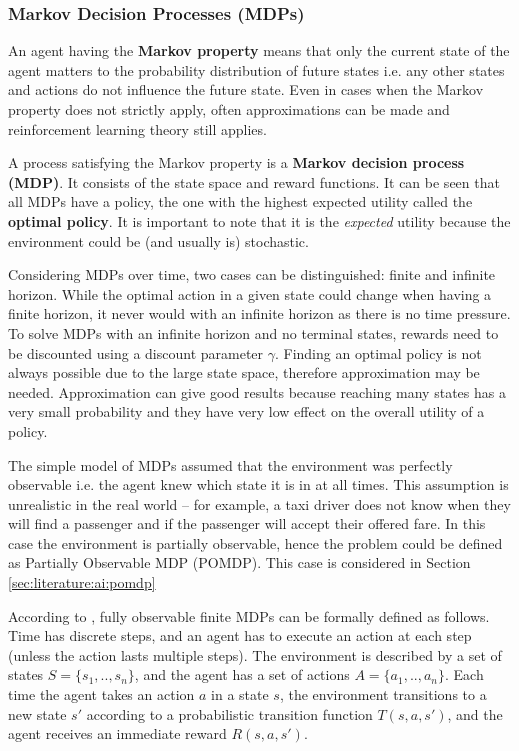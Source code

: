 \subsubsection{Markov Decision Processes (MDPs)}
\label{sec:literature:ai:mdp}

An agent having the \textbf{Markov property} means that only the current state
of the agent matters to the probability distribution of future states i.e. any
other states and actions do not influence the future state. Even in cases when
the Markov property does not strictly apply, often approximations can be made
and reinforcement learning theory still applies.
\parencite{Sutton1998ai+reinforcement}

A process satisfying the Markov property is a \textbf{Markov decision process
(MDP)}. It consists of the state space and reward functions. It can be seen
that all MDPs have a policy, the one with the highest expected utility called
the \textbf{optimal policy}. It is important to note that it is the
\textit{expected} utility because the environment could be (and usually is)
stochastic. \parencite{Russell2010ai+modern}

Considering MDPs over time, two cases can be distinguished: finite and infinite
horizon. While the optimal action in a given state could change when having a
finite horizon, it never would with an infinite horizon as there is no time
pressure. To solve MDPs with an infinite horizon and no terminal states,
rewards need to be discounted using a discount parameter \(\gamma\). Finding an
optimal policy is not always possible due to the large state space, therefore
approximation may be needed. Approximation can give good results because
reaching many states has a very small probability and they have very low effect
on the overall utility of a policy. \parencite{Russell2010ai+modern}

The simple model of MDPs assumed that the environment was perfectly observable
i.e. the agent knew which state it is in at all times. This assumption is
unrealistic in the real world -- for example, a taxi driver does not know when
they will find a passenger and if the passenger will accept their offered fare.
In this case the environment is partially observable, hence the problem could
be defined as Partially Observable MDP (POMDP). This case is considered in
Section \ref{sec:literature:ai:pomdp}

According to \textcite{Spaan2012ai+pomdp}, fully observable finite MDPs can be
formally defined as follows. Time has discrete steps, and an agent has to
execute an action at each step (unless the action lasts multiple steps). The
environment is described by a set of states \(S = \{s_1,..,s_n\}\), and the
agent has a set of actions \(A = \{a_1,..,a_n\}\). Each time the agent takes an
action \(a\) in a state \(s\), the environment transitions to a new state
\(s'\) according to a probabilistic transition function \(T(s,a,s')\), and the
agent receives an immediate reward \(R(s,a,s')\).

